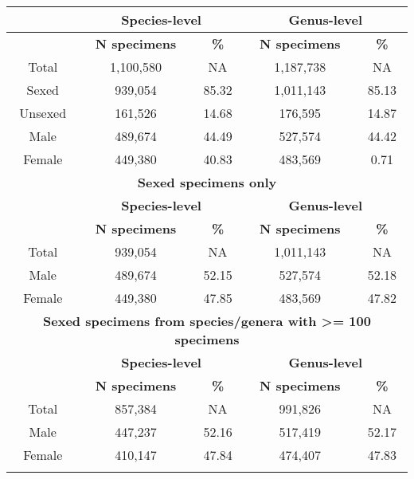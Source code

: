 \begin{longtable}{ccccc}
  \hline
  & \multicolumn{2}{c}{\textbf{Species-level}} & \multicolumn{2}{c}{\textbf{Genus-level}} \\
  \hline
  & \textbf{N specimens} & \textbf{\%} & \textbf{N specimens} & \textbf{\%}\\
\hline
Total & 1,100,580 & NA & 1,187,738 & NA\\
Sexed & 939,054 & 85.32 & 1,011,143 & 85.13\\
Unsexed & 161,526 & 14.68 & 176,595 & 14.87\\
Male & 489,674 & 44.49 & 527,574 & 44.42\\
Female & 449,380 & 40.83 & 483,569 & 0.71\\
\hline
\multicolumn{5}{c}{\textbf{Sexed specimens only}}\\
  \hline
  & \multicolumn{2}{c}{\textbf{Species-level}} & \multicolumn{2}{c}{\textbf{Genus-level}} \\
  \hline
  & \textbf{N specimens} & \textbf{\%} & \textbf{N specimens} & \textbf{\%}\\
\hline
Total & 939,054 & NA & 1,011,143 & NA\\
Male & 489,674 & 52.15 & 527,574 & 52.18\\
Female & 449,380 & 47.85 & 483,569 & 47.82\\
\hline
\multicolumn{5}{c}{\textbf{Sexed specimens from species/genera with >= 100 specimens}}\\
  \hline
  & \multicolumn{2}{c}{\textbf{Species-level}} & \multicolumn{2}{c}{\textbf{Genus-level}} \\
  \hline
  & \textbf{N specimens} & \textbf{\%} & \textbf{N specimens} & \textbf{\%}\\
\hline
Total & 857,384 & NA & 991,826 & NA\\
Male & 447,237 & 52.16 & 517,419 & 52.17\\
Female & 410,147 & 47.84 & 474,407 & 47.83\\
\hline

\label{table_genus}
\end{longtable}





